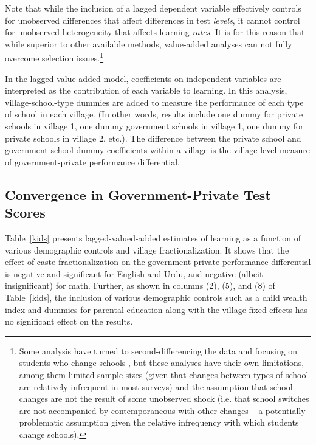 \documentclass[Eubank_pk_ethnic_sorting.tex]{subfiles}
\begin{document}
Note that while the inclusion of a lagged dependent variable effectively controls for unobserved differences that affect differences in test \emph{levels}, it cannot control for unobserved heterogeneity that affects learning \emph{rates}. It is for this reason that while superior to other available methods, value-added analyses can not fully overcome selection issues.\footnote{Some analysis have turned to second-differencing the data and focusing on students who change schools \citep{Andrabi:2011hl}, but these analyses have their own limitations, among them limited sample sizes (given that changes between types of school are relatively infrequent in most surveys) and the assumption that school changes are not the result of some unobserved shock (i.e. that school switches are not accompanied by contemporaneous with other changes -- a potentially problematic assumption given the relative infrequency with which students change schools).}

In the lagged-value-added model, coefficients on independent variables are interpreted as the contribution of each variable to learning. In this analysis, village-school-type dummies are added to measure the performance of each type of school in each village. (In other words, results include one dummy for private schools in village 1, one dummy government schools in village 1, one dummy for private schools in village 2, etc.). The difference between the private school and government school dummy coefficients within a village is the village-level measure of government-private performance differential. 

\subsection{Convergence in Government-Private Test Scores}\label{}


Table~\ref{kids} presents lagged-valued-added estimates of learning as a function of various demographic controls and village fractionalization. It shows that the effect of caste fractionalization on the government-private performance differential is negative and significant for English and Urdu, and negative (albeit insignificant) for math. Further, as shown in columns (2), (5), and (8) of Table~\ref{kids}, the inclusion of various demographic controls such as a child wealth index and dummies for parental education along with the village fixed effects has no significant effect on the results. 


\end{document}
